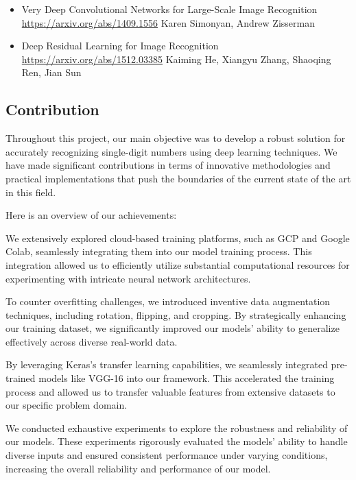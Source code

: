 \documentclass[12pt,a4paper]{article}
\begin{document}
\begin{itemize}
    \item Very Deep Convolutional Networks for Large-Scale Image Recognition
    \newline \url{https://arxiv.org/abs/1409.1556}
    \newline Karen Simonyan, Andrew Zisserman

    \item Deep Residual Learning for Image Recognition
    \newline \url{https://arxiv.org/abs/1512.03385}
    \newline Kaiming He, Xiangyu Zhang, Shaoqing Ren, Jian Sun
\end{itemize}

\subsection{Contribution}
Throughout this project, our main objective was to develop a robust solution for accurately recognizing single-digit numbers using deep learning techniques. We have made significant contributions in terms of innovative methodologies and practical implementations that push the boundaries of the current state of the art in this field.
\linebreak
\linebreak

Here is an overview of our achievements:

We extensively explored cloud-based training platforms, such as GCP and Google Colab, seamlessly integrating them into our model training process. This integration allowed us to efficiently utilize substantial computational resources for experimenting with intricate neural network architectures.

To counter overfitting challenges, we introduced inventive data augmentation techniques, including rotation, flipping, and cropping. By strategically enhancing our training dataset, we significantly improved our models' ability to generalize effectively across diverse real-world data.

By leveraging Keras's transfer learning capabilities, we seamlessly integrated pre-trained models like VGG-16 into our framework. This accelerated the training process and allowed us to transfer valuable features from extensive datasets to our specific problem domain.

We conducted exhaustive experiments to explore the robustness and reliability of our models. These experiments rigorously evaluated the models' ability to handle diverse inputs and ensured consistent performance under varying conditions, increasing the overall reliability and performance of our model.
\end{document}
